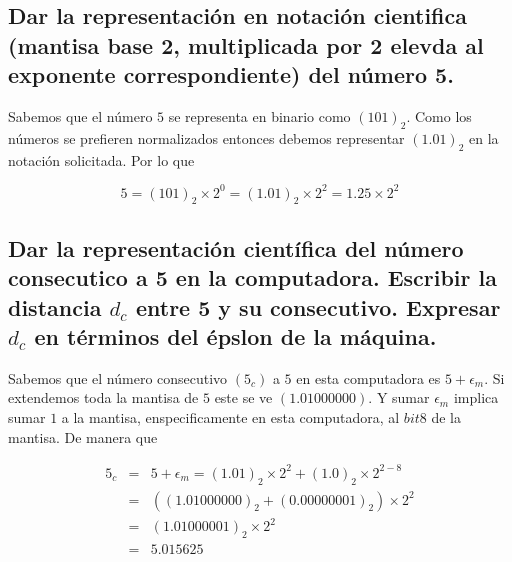 \documentclass[11pt]{article}
\begin{document}
    \hypertarget{dar-la-representaciuxf3n-en-notaciuxf3n-cientifica-mantisa-base-2-multiplicada-por-2-elevda-al-exponente-correspondiente-del-nuxfamero-5.}{%
\subsection{Dar la representación en notación cientifica (mantisa
base 2, multiplicada por 2 elevda al exponente correspondiente) del
número
5.}\label{dar-la-representaciuxf3n-en-notaciuxf3n-cientifica-mantisa-base-2-multiplicada-por-2-elevda-al-exponente-correspondiente-del-nuxfamero-5.}}

    Sabemos que el número \(5\) se representa en binario como \((101)_2\).
Como los números se prefieren normalizados entonces debemos representar
\((1.01)_2\) en la notación solicitada. Por lo que

\begin{equation*} 5 = (101)_2 \times 2^0 = (1.01)_2 \times 2^2 = 1.25 \times 2^2
\end{equation*}

    \hypertarget{dar-la-representaciuxf3n-cientuxedfica-del-nuxfamero-consecutico-a-5-en-la-computadora.-escribir-la-distancia-d_c-entre-5-y-su-consecutivo.-expresar-d_c-en-tuxe9rminos-del-uxe9pslon-de-la-muxe1quina.}{%
\subsection{\texorpdfstring{Dar la representación científica del
número consecutico a 5 en la computadora. Escribir la distancia \(d_c\)
entre 5 y su consecutivo. Expresar \(d_c\) en términos del épslon de la
máquina.}{Dar la representación científica del número consecutico a 5 en la computadora. Escribir la distancia d\_c entre 5 y su consecutivo. Expresar d\_c en términos del épslon de la máquina.}}\label{dar-la-representaciuxf3n-cientuxedfica-del-nuxfamero-consecutico-a-5-en-la-computadora.-escribir-la-distancia-d_c-entre-5-y-su-consecutivo.-expresar-d_c-en-tuxe9rminos-del-uxe9pslon-de-la-muxe1quina.}}

    Sabemos que el número consecutivo \((5_c)\) a \(5\) en esta computadora
es \(5+\epsilon_m\). Si extendemos toda la mantisa de \(5\) este se ve
\((1.01000000)\). Y sumar \(\epsilon_m\) implica sumar \(1\) a la
mantisa, enspecificamente en esta computadora, al \(bit 8\) de la
mantisa. De manera que

\begin{eqnarray*} 
    5_c &=& 5 + \epsilon_m 
    = (1.01)_2 \times 2^2 + (1.0)_2 \times 2^{2-8} \\ 
    &=& ((1.01000000)_2 + (0.00000001)_2) \times 2^2 \\
    &=& (1.01000001)_2 \times 2^2 \\
    &=& 5.015625
\end{eqnarray*}
\end{document}

